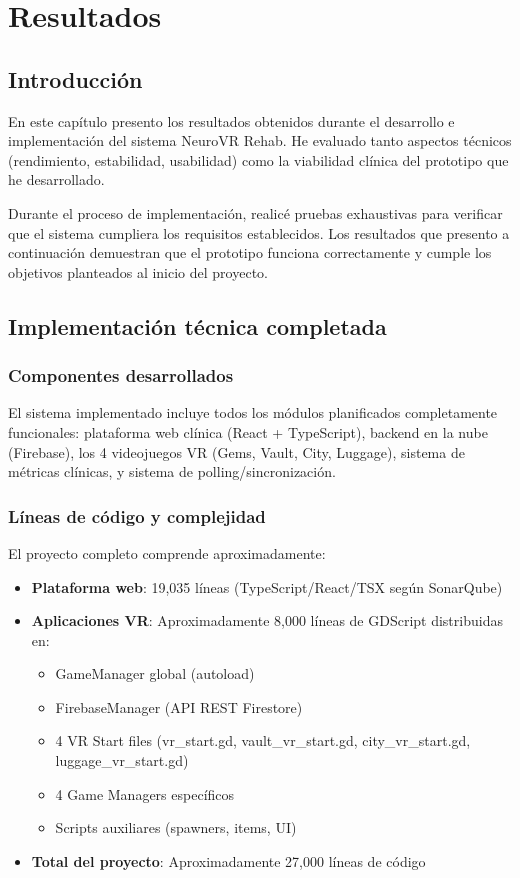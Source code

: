 \chapter{Resultados}

\section{Introducción}

En este capítulo presento los resultados obtenidos durante el desarrollo e implementación del sistema NeuroVR Rehab. He evaluado tanto aspectos técnicos (rendimiento, estabilidad, usabilidad) como la viabilidad clínica del prototipo que he desarrollado.

Durante el proceso de implementación, realicé pruebas exhaustivas para verificar que el sistema cumpliera los requisitos establecidos. Los resultados que presento a continuación demuestran que el prototipo funciona correctamente y cumple los objetivos planteados al inicio del proyecto.

\section{Implementación técnica completada}

\subsection{Componentes desarrollados}

El sistema implementado incluye todos los módulos planificados completamente funcionales: plataforma web clínica (React + TypeScript), backend en la nube (Firebase), los 4 videojuegos VR (Gems, Vault, City, Luggage), sistema de métricas clínicas, y sistema de polling/sincronización.

\subsection{Líneas de código y complejidad}

El proyecto completo comprende aproximadamente:

\begin{itemize}
    \item \textbf{Plataforma web}: 19,035 líneas (TypeScript/React/TSX según SonarQube)
    \item \textbf{Aplicaciones VR}: Aproximadamente 8,000 líneas de GDScript distribuidas en:
    \begin{itemize}
        \item GameManager global (autoload)
        \item FirebaseManager (API REST Firestore)
        \item 4 VR Start files (vr\_start.gd, vault\_vr\_start.gd, city\_vr\_start.gd, luggage\_vr\_start.gd)
        \item 4 Game Managers específicos
        \item Scripts auxiliares (spawners, items, UI)
    \end{itemize}
    \item \textbf{Total del proyecto}: Aproximadamente 27,000 líneas de código
\end{itemize}

